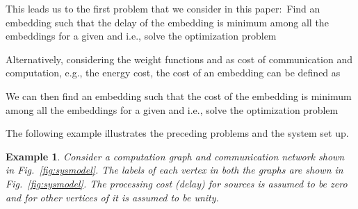 \documentclass[journal]{IEEEtran}
\newtheorem{example}{{\bf Example}}
\begin{document}
This leads us to the first problem that we consider in this
paper:~Find an embedding  such that the delay of
the embedding is minimum among all the embeddings for a given
 and  i.e., solve the
optimization problem



Alternatively, considering the weight functions   and
 as cost of communication and computation, e.g., the
energy cost, the cost of an embedding can be defined as

We can then find an embedding  such that the cost
of the embedding is minimum among all the embeddings for a given
 and  i.e., solve the
optimization problem


The following example illustrates the preceding problems and the
system set up. 

\begin{example}
 \label{ex:delaycostcomp}
  Consider a computation graph 
  and communication network  shown in
  Fig.~\ref{fig:sysmodel}.  The labels of each vertex in both the
  graphs are shown in Fig.~\ref{fig:sysmodel}.  The processing
  cost (delay) for sources is assumed to be zero and for other
  vertices of  it is assumed to be unity.
\begin{figure}[tbp]
\centering
{}
\end{figure}
\end{example}
\end{document}
